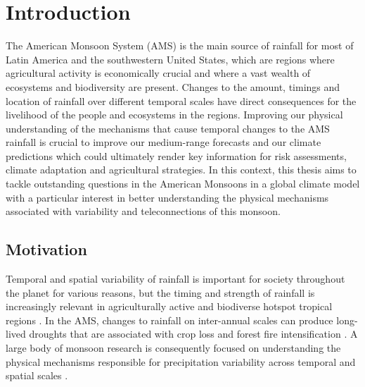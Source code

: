 

\chapter{\label{ch:1-intro}Introduction} 


The American Monsoon System (AMS) is the main source of rainfall for most of
Latin America and the southwestern United States, which are regions where agricultural
activity is economically crucial and where a vast wealth of ecosystems and biodiversity are
present. Changes to the amount, timings and location of rainfall over different temporal scales
have direct consequences for the livelihood of the people and ecosystems in the regions.
Improving our physical understanding of the mechanisms that cause temporal changes to the
AMS rainfall is crucial to improve our medium-range forecasts and our climate predictions
which could ultimately render key information for risk assessments, climate adaptation and
agricultural strategies. In this context, this thesis aims to tackle outstanding questions in the
American Monsoons in a global climate model with a particular interest in better understanding
the physical mechanisms associated with variability and teleconnections of this monsoon.


\section{Motivation}

Temporal and spatial variability of rainfall is important for society throughout the planet for various reasons, but the timing and strength of rainfall is increasingly relevant in agriculturally active and biodiverse hotspot tropical regions \citep{sultan2005,jain2015}. 
In the AMS, changes to rainfall on inter-annual scales can produce long-lived droughts that are associated with crop loss and forest fire intensification \citep{chen2009,harvey2018}.
A large body of monsoon research is consequently focused on understanding the physical mechanisms responsible for precipitation variability across temporal and spatial scales \citep{wang2017,gadgil2018}. 

